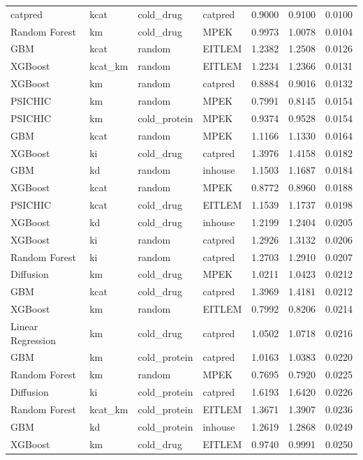 \begin{tabular}{llllrrr}
catpred & kcat & cold_drug & catpred & 0.9000 & 0.9100 & 0.0100 \\
Random Forest & km & cold_drug & MPEK & 0.9973 & 1.0078 & 0.0104 \\
GBM & kcat & random & EITLEM & 1.2382 & 1.2508 & 0.0126 \\
XGBoost & kcat_km & random & EITLEM & 1.2234 & 1.2366 & 0.0131 \\
XGBoost & km & random & catpred & 0.8884 & 0.9016 & 0.0132 \\
PSICHIC & km & random & MPEK & 0.7991 & 0.8145 & 0.0154 \\
PSICHIC & km & cold_protein & MPEK & 0.9374 & 0.9528 & 0.0154 \\
GBM & kcat & random & MPEK & 1.1166 & 1.1330 & 0.0164 \\
XGBoost & ki & cold_drug & catpred & 1.3976 & 1.4158 & 0.0182 \\
GBM & kd & random & inhouse & 1.1503 & 1.1687 & 0.0184 \\
XGBoost & kcat & random & MPEK & 0.8772 & 0.8960 & 0.0188 \\
PSICHIC & kcat & cold_drug & EITLEM & 1.1539 & 1.1737 & 0.0198 \\
XGBoost & kd & cold_drug & inhouse & 1.2199 & 1.2404 & 0.0205 \\
XGBoost & ki & random & catpred & 1.2926 & 1.3132 & 0.0206 \\
Random Forest & ki & random & catpred & 1.2703 & 1.2910 & 0.0207 \\
Diffusion & km & cold_drug & MPEK & 1.0211 & 1.0423 & 0.0212 \\
GBM & kcat & cold_drug & catpred & 1.3969 & 1.4181 & 0.0212 \\
XGBoost & km & random & EITLEM & 0.7992 & 0.8206 & 0.0214 \\
Linear Regression & km & cold_drug & catpred & 1.0502 & 1.0718 & 0.0216 \\
GBM & km & cold_protein & catpred & 1.0163 & 1.0383 & 0.0220 \\
Random Forest & km & random & MPEK & 0.7695 & 0.7920 & 0.0225 \\
Diffusion & ki & cold_protein & catpred & 1.6193 & 1.6420 & 0.0226 \\
Random Forest & kcat_km & cold_protein & EITLEM & 1.3671 & 1.3907 & 0.0236 \\
GBM & kd & cold_protein & inhouse & 1.2619 & 1.2868 & 0.0249 \\
XGBoost & km & cold_drug & EITLEM & 0.9740 & 0.9991 & 0.0250 \\

\end{tabular}
